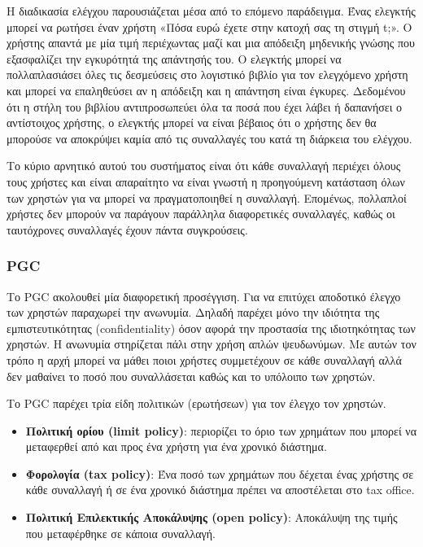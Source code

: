 Η διαδικασία ελέγχου παρουσιάζεται μέσα από το επόμενο παράδειγμα. Ένας ελεγκτής μπορεί να ρωτήσει έναν χρήστη «Πόσα ευρώ έχετε στην κατοχή σας τη στιγμή t;». Ο χρήστης απαντά με μία τιμή περιέχωντας μαζί και μια απόδειξη μηδενικής γνώσης που εξασφαλίζει την εγκυρότητά της απάντησής του. Ο ελεγκτής μπορεί να πολλαπλασιάσει όλες τις δεσμεύσεις στο λογιστικό βιβλίο για τον ελεγχόμενο χρήστη και μπορεί να επαληθεύσει αν η απόδειξη και η απάντηση είναι έγκυρες. Δεδομένου ότι η στήλη του βιβλίου αντιπροσωπεύει όλα τα ποσά που έχει λάβει ή δαπανήσει ο αντίστοιχος χρήστης, ο ελεγκτής μπορεί να είναι βέβαιος ότι ο χρήστης δεν θα μπορούσε να αποκρύψει καμία από τις συναλλαγές του κατά τη διάρκεια του ελέγχου.

Το κύριο αρνητικό αυτού του συστήματος είναι ότι κάθε συναλλαγή περιέχει όλους τους χρήστες και είναι απαραίτητο να είναι γνωστή η προηγούμενη κατάσταση όλων των χρηστών για να μπορεί να πραγματοποιηθεί η συναλλαγή. Επομένως, πολλαπλοί χρήστες δεν μπορούν να παράγουν παράλληλα διαφορετικές συναλλαγές, καθώς οι ταυτόχρονες συναλλαγές έχουν πάντα συγκρούσεις.

\subsubsection{PGC}
Το PGC ακολουθεί μία διαφορετική προσέγγιση. Για να επιτύχει αποδοτικό έλεγχο των χρηστών παραχωρεί την ανωνυμία. Δηλαδή παρέχει μόνο την ιδιότητα της εμπιστευτικότητας (confidentiality) όσον αφορά την προστασία της ιδιοτηκότητας των χρηστών. Η ανωνυμία στηρίζεται πάλι στην χρήση απλών ψευδωνύμων. Με αυτών τον τρόπο η αρχή μπορεί να μάθει ποιοι χρήστες συμμετέχουν σε κάθε συναλλαγή αλλά δεν μαθαίνει το ποσό που συναλλάσεται καθώς και το υπόλοιπο των χρηστών. 

Το PGC παρέχει τρία είδη πολιτικών (ερωτήσεων) για τον έλεγχο τον χρηστών. 
\begin{itemize}
    \item \textbf{Πολιτική ορίου (limit policy)}: περιορίζει το όριο των χρημάτων που μπορεί να μεταφερθεί από και προς ένα χρήστη για ένα χρονικό διάστημα.
    \item \textbf{Φορολογία (tax policy)}: Ένα ποσό των χρημάτων που δέχεται ένας χρήστης σε κάθε συναλλαγή ή σε ένα χρονικό διάστημα πρέπει να αποστέλεται στο tax office.
    \item \textbf{Πολιτική Επιλεκτικής Αποκάλυψης (open policy)}: Αποκάλυψη της τιμής που μεταφέρθηκε σε κάποια συναλλαγή.
\end{itemize}


